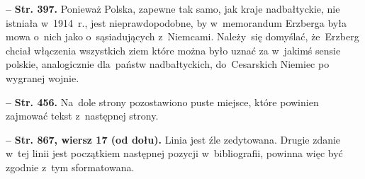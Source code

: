 \documentclass[a4paper,11pt]{article}
\newcommand{\spaceFour}{0.5em}
\newcommand{\tb}{\textbf}
\newcommand{\noi}{\noindent}
\newcommand{\start}{\noi \tb{--} {}}
\newcommand{\Str}[1]{\tb{Str. #1.}}
\newcommand{\StrWd}[2]{\tb{Str. #1, wiersz #2 (od dołu).}}
\begin{document}
\vspace{\spaceFour}


\start \Str{397} Ponieważ Polska, zapewne tak samo, jak kraje
nadbałtyckie, nie istniała w~1914~r., jest nieprawdopodobne, by
w~memorandum Erzberga była mowa o~nich jako o~sąsiadujących
z~Niemcami. Należy~się domyślać, że~Erzberg chciał włączenia
wszystkich ziem które można było uznać za w~jakimś sensie polskie,
analogicznie dla~państw nadbałtyckich, do~Cesarskich Niemiec po
wygranej wojnie.

\vspace{\spaceFour}


\start \Str{456} Na~dole strony pozostawiono puste miejsce, które
powinien zajmować tekst z~następnej strony.

\vspace{\spaceFour}


\start \StrWd{867}{17} Linia jest źle zedytowana. Drugie zdanie w~tej
linii jest początkiem następnej pozycji w~bibliografii, powinna więc
być zgodnie z~tym sformatowana.

\vspace{\spaceFour}
\end{document}
